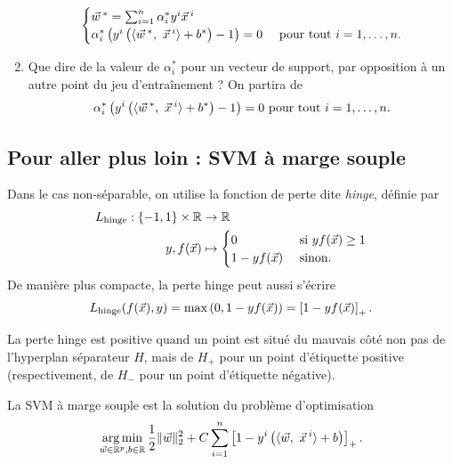\documentclass[french,11pt]{article}
\begin{document}
\begin{enumerate}[resume]
  \begin{equation*}
    \begin{cases}
  \ww^* = \sum_{i=1}^n \alpha_i^* y^i \xx^i & \\
  \alpha_i^* \left(y^i \left(\innerproduct{\ww^*,~\xx^i} + b^*\right) - 1 \right) = 0 & \text{ pour tout } i=1, \dots, n.\\
\end{cases}
\end{equation*}
\item Que dire de la valeur de $\alpha_i^*$ pour un vecteur de support, par opposition à un autre point du jeu d'entraînement ? On partira de
  \begin{equation*}
    \alpha_i^* \left(y^i \left(\innerproduct{\ww^*,~\xx^i} + b^*\right) - 1 \right) = 0  \text{ pour tout } i=1, \dots, n.
  \end{equation*}
  \end{enumerate}



\subsection{Pour aller plus loin : SVM à marge souple}
Dans le cas non-séparable, on utilise la fonction de perte dite \textit{hinge},
définie par
\begin{align*}
  L_{\text{hinge}} : \{-1, 1\} \times \RR & \rightarrow \RR \\
  y, f(\xx) & \mapsto
              \begin{cases}
                0 & \mbox{ si } y f(\xx) \geq 1 \\
                1 - y f(\xx) & \mbox{ sinon.}
              \end{cases}
\end{align*}
De manière plus compacte, la perte hinge peut aussi s'écrire 
\begin{equation*}
  \label{eq:hinge-loss}
  L_{\text{hinge}}(f(\xx), y) = \max\left(0, 1 - y f(\xx) \right) = \left[ 1 - y f(\xx)\right]_+. 
\end{equation*}

La perte hinge est positive quand un point est situé du mauvais côté non pas de
l'hyperplan séparateur $H$, mais de $H_+$ pour un point d'étiquette positive
(respectivement, de $H_-$ pour un point d'étiquette négative).

La SVM à marge souple est la solution du problème d'optimisation
\begin{equation}
  \argmin_{\ww \in \RR^p, b \in \RR} \frac{1}{2} \ltwonorm{\ww}^2 + 
  C \sum_{i=1}^n \left[ 1 - y^i  \left(\innerproduct{\ww,~\xx^i} + b\right) \right]_+.
  \label{eq:soft-margin-svm}
\end{equation}
\end{document}
